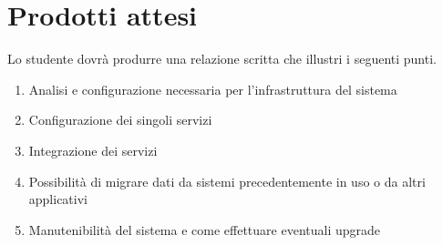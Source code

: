 \newpage
\section*{Prodotti attesi}
Lo studente dovrà produrre una relazione scritta che illustri i seguenti punti.
\begin{enumerate}
    \item Analisi e configurazione necessaria per l'infrastruttura del sistema 
	\item Configurazione dei singoli servizi
	\item Integrazione dei servizi
	\item Possibilità di migrare dati da sistemi precedentemente in uso o da altri applicativi
	\item Manutenibilità del sistema e come effettuare eventuali upgrade    
\end{enumerate}